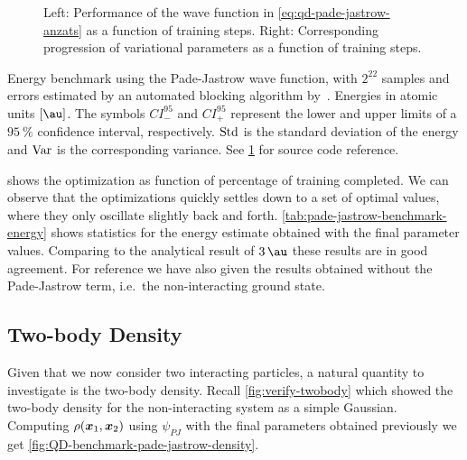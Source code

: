 \documentclass[Thesis.tex]{subfiles}
\begin{document}
\begin{figure}[h]
   \centering
    \resizebox{\linewidth}{!}{%
        
    }
    \caption[Learning progression of Pade-Jastrow wave function]{\label{fig:QD-benchmark-pade-jastrow-training}Left: Performance of the
      wave function in \cref{eq:qd-pade-jastrow-anzats} as a function of
      training steps. Right: Corresponding progression of variational parameters as a function
      of training steps.}
\end{figure}

\begin{table}[h]
  \centering
  \caption[Energy estimates of Pade-Jastrow wave function]{Energy benchmark
using the Pade-Jastrow wave function, with $2^{22}$ samples and errors estimated
by an automated blocking algorithm by~\textcite{Jonsson-2018}. Energies in
atomic units $[\si{\au}]$. The symbols $CI_{-}^{95}$ and $CI_{+}^{95}$ represent
the lower and upper limits of a $\SI{95}{\percent}$ confidence interval, respectively. $\operatorname{Std}$
is the standard deviation of the energy and $\operatorname{Var}$ is the corresponding
variance. See \cref{fig:QD-benchmark-pade-jastrow-training} for source code
reference.}
  
  \label{tab:pade-jastrow-benchmark-energy}
\end{table}

 shows the optimization as function
of percentage of training completed. We can observe that the optimizations
quickly settles down to a set of optimal values, where they only oscillate
slightly back and forth. \cref{tab:pade-jastrow-benchmark-energy} shows
statistics for the energy estimate obtained with the final parameter values. Comparing to the
analytical result of $\SI{3}{\au}$ these results are in good agreement. For
reference we have also given the results obtained without the Pade-Jastrow term,
i.e.\ the non-interacting ground state.

\subsection{Two-body Density}

Given that we now consider two interacting particles, a natural quantity to
investigate is the two-body density. Recall \cref{fig:verify-twobody} which
showed the two-body density for the non-interacting system as a simple Gaussian.
Computing $\rho(\bm{x}_1, \bm{x}_2)$ using $\psi_{PJ}$ with the final parameters
obtained previously we get \cref{fig:QD-benchmark-pade-jastrow-density}.
\end{document}
